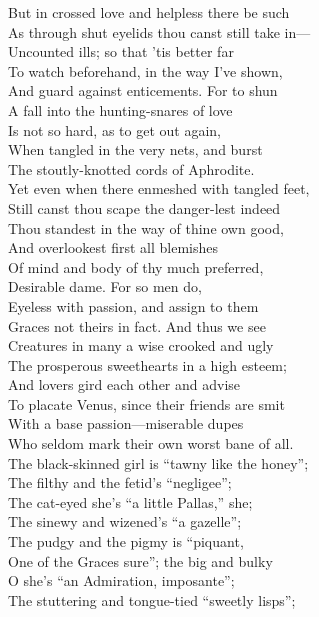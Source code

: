 But in crossed love and helpless there be such\\
As through shut eyelids thou canst still take in—\\
Uncounted ills; so that 'tis better far\\
To watch beforehand, in the way I've shown,\\
And guard against enticements. For to shun\\
A fall into the hunting-snares of love\\
Is not so hard, as to get out again,\\
When tangled in the very nets, and burst\\
The stoutly-knotted cords of Aphrodite.\\
Yet even when there enmeshed with tangled feet,\\
Still canst thou scape the danger-lest indeed\\
Thou standest in the way of thine own good,\\
And overlookest first all blemishes\\
Of mind and body of thy much preferred,\\
Desirable dame. For so men do,\\
Eyeless with passion, and assign to them\\
Graces not theirs in fact. And thus we see\\
Creatures in many a wise crooked and ugly\\
The prosperous sweethearts in a high esteem;\\
And lovers gird each other and advise\\
To placate Venus, since their friends are smit\\
With a base passion—miserable dupes\\
Who seldom mark their own worst bane of all.\\
The black-skinned girl is ``tawny like the honey'';\\
The filthy and the fetid's ``negligee'';\\
The cat-eyed she's ``a little Pallas,'' she;\\
The sinewy and wizened's ``a gazelle'';\\
The pudgy and the pigmy is ``piquant,\\
One of the Graces sure''; the big and bulky\\
O she's ``an Admiration, imposante'';\\
The stuttering and tongue-tied ``sweetly lisps'';\\
